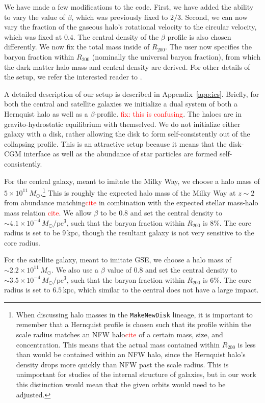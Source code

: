\documentclass[linenumbers, twocolumn]{aastex631}
\newcommand{\Msun}{\ensuremath{M_{\odot}}}
\newcommand{\kpc}{\ensuremath{\textrm{kpc}}}
\newcommand{\pc}{\ensuremath{\textrm{pc}}}
\newcommand{\red}[1]{\textcolor{red}{#1}}
\begin{document}
We have made a few modifications to the \citet{2023MNRAS.tmp.2070B} code. First, we have added the ability to vary the value of $\beta$, which was previously fixed to $2/3$. Second, we can now vary the fraction of the gaseous halo's rotational velocity to the circular velocity, which was fixed at $0.4$. The central density of the $\beta$ profile is also chosen differently. We now fix the total mass inside of $R_{200}$. The user now specifies the baryon fraction within $R_{200}$ (nominally the universal baryon fraction), from which the dark matter halo mass and central density are derived. For other details of the setup, we refer the interested reader to \citet{2023MNRAS.tmp.2070B}.

A detailed description of our setup is described in Appendix~\ref{app:ics}. Briefly, for both the central and satellite galaxies we initialize a dual system of both a Hernquist halo as well as a $\beta$-profile. \red{fix: this is confusing}. The haloes are in gravito-hydrostatic equilibrium with themselved. We do not initialize either galaxy with a disk, rather allowing the disk to form self-consistently out of the collapsing profile. This is an attractive setup because it means that the disk-CGM interface as well as the abundance of star particles are formed self-consistently.

For the central galaxy, meant to imitate the Milky Way, we choose a halo mass of $5\times10^{11}\,\Msun$.\footnote{When discussing halo masses in the \texttt{MakeNewDisk} lineage, it is important to remember that a Hernquist profile is chosen such that its profile within the scale radius matches an NFW halo\red{cite} of a certain mass, size, and concentration. This means that the actual mass contained within $R_{200}$ is less than would be contained within an NFW halo, since the Hernquist halo's density drops more quickly than NFW past the scale radius. This is unimportant for studies of the internal structure of galaxies, but in our work this distinction would mean that the given orbits would need to be adjusted.} This is roughly the expected halo mass of the Milky Way at $z\sim2$ from abundance matching\red{cite} in combination with the expected stellar mass-halo mass relation \red{cite}. We allow $\beta$ to be $0.8$ and set the central density to $\sim4.1\times10^{-4}\,\Msun/\pc^3$, such that the baryon fraction within $R_{200}$ is $8\%$. The core radius is set to be $9\,\kpc$, though the resultant galaxy is not very sensitive to the core radius.

For the satellite galaxy, meant to imitate GSE, we choose a halo mass of $\sim2.2\times10^{11}\,\Msun$. We also use a $\beta$ value of $0.8$ and set the central density to $\sim3.5\times10^{-4}\,\Msun/\pc^3$, such that the baryon fraction within $R_{200}$ is $6\%$. The core radius is set to $6.5\,\kpc$, which similar to the central does not have a large impact.
\end{document}
